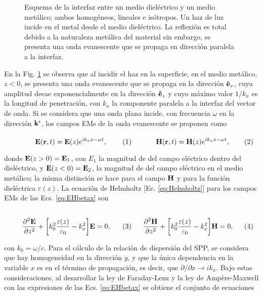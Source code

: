 \begin{figure}[h!]
	\caption{ Esquema de la interfaz entre un medio dieléctrico y un medio metálico; ambos homogéneos, lineales e isótropos. Un haz de luz incide en el metal desde el medio dieléctrico.  La reflexión es total debido a la naturaleza metálica del material sin embargo, se presenta una onda evanescente que se propaga en dirección paralela a la interfaz.}\label{fig:SPP}
	\end{figure}
	
En la Fig. \ref{fig:SPP} se observa que al incidir el haz en la superficie, en el medio metálico, $z<0$, se presenta una onda evanescente que se propaga en la dirección $\vu{e}_x$, cuya amplitud decae exponencialmente en la dirección $\vu{e}_z$ y cuyo máximo valor $1/k_x$ es la longitud de penetración, con $k_x$ la componente paralela a la interfaz del vector de onda. Si se considera que una onda plana incide, con frecuencia $\omega$ en la dirección $\vb{k}^i$, los campos EMs de la onda evanescente se proponen como 

	\begin{subequations}\eqhalf{	\vb{E}(\vb{r},t) = \vb{E}(z)e^{ik_x x-\omega t },}
	\eqhalf{\vb{H}(\vb{r},t) = \vb{H}(z)e^{ik_x x-\omega t},}
	\label{eq:EHbetax}\end{subequations} \vspace*{-1em}
	
\noindent donde $\vb{E}(z>0)=\vb{E}_1$, con $E_1$ la magnitud de del campo eléctrico dentro del dieléctrico, y $\vb{E}(z<0)=\vb{E}_2$, la magnitud de del campo eléctrico en el medio metálico; la misma distinción se hace para el campo $\vb{H}$ y para la función dieléctrica $\varepsilon(z)$. La ecuación de Helmholtz [Ec. \eqref{eq:Helmholtz}] para los campos EMs de las Ecs. \eqref{eq:EHbetax} son

	\begin{subequations}
	\eqhalf{	\pdv[2]{\vb{E}}{z} + \qty[k_0^2\frac{\varepsilon(z)}{\varepsilon_0} - k_x^2 ] \vb{E}= 0,\label{eq:helmE}}
	\eqhalf{\pdv[2]{\vb{H}}{z} + \qty[k_0^2\frac{\varepsilon(z)}{\varepsilon_0}  - k_x^2 ] \vb{H}= 0, \label{eq:helmH}}
	\end{subequations} 
	
\noindent con $k_0 = \omega/c$. Para el cálculo de la relación de dispersión del SPP, se considera que hay homogeneidad en la dirección $y$, y que la única dependencia en la variable $x$  es en el término de propagación, es decir, que $\partial/\partial x\to ik_x$. Bajo estas consideraciones, al desarrollar la ley de Faraday-Lenz y la ley de Ampère-Maxwell con las expresiones de las Ecs. \eqref{eq:EHbetax} se obtiene el conjunto de ecuaciones \vspace*{-1em}

